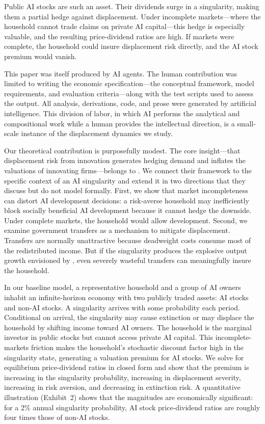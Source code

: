 \documentclass[12pt]{article}
\begin{document}
Public AI stocks are such an asset.
Their dividends surge in a singularity, making them a partial hedge against displacement.
Under incomplete markets---where the household cannot trade claims on private AI capital---this hedge is especially valuable, and the resulting price-dividend ratios are high.
If markets were complete, the household could insure displacement risk directly, and the AI stock premium would vanish.

This paper was itself produced by AI agents.
The human contribution was limited to writing the economic specification---the conceptual framework, model requirements, and evaluation criteria---along with the test scripts used to assess the output.
All analysis, derivations, code, and prose were generated by artificial intelligence.
This division of labor, in which AI performs the analytical and compositional work while a human provides the intellectual direction, is a small-scale instance of the displacement dynamics we study.

Our theoretical contribution is purposefully modest.
The core insight---that displacement risk from innovation generates hedging demand and inflates the valuations of innovating firms---belongs to \citet{GKP2012}.
We connect their framework to the specific context of an AI singularity and extend it in two directions that they discuss but do not model formally.
First, we show that market incompleteness can distort AI development decisions: a risk-averse household may inefficiently block socially beneficial AI development because it cannot hedge the downside.
Under complete markets, the household would allow development.
Second, we examine government transfers as a mechanism to mitigate displacement.
Transfers are normally unattractive because deadweight costs consume most of the redistributed income.
But if the singularity produces the explosive output growth envisioned by \citet{Jones2024}, even severely wasteful transfers can meaningfully insure the household.

In our baseline model, a representative household and a group of AI owners inhabit an infinite-horizon economy with two publicly traded assets: AI stocks and non-AI stocks.
A singularity arrives with some probability each period.
Conditional on arrival, the singularity may cause extinction \citep{Jones2024,Bostrom2014} or may displace the household by shifting income toward AI owners.
The household is the marginal investor in public stocks but cannot access private AI capital.
This incomplete-markets friction makes the household's stochastic discount factor high in the singularity state, generating a valuation premium for AI stocks.
We solve for equilibrium price-dividend ratios in closed form and show that the premium is increasing in the singularity probability, increasing in displacement severity, increasing in risk aversion, and decreasing in extinction risk.
A quantitative illustration (Exhibit~2) shows that the magnitudes are economically significant: for a 2\% annual singularity probability, AI stock price-dividend ratios are roughly four times those of non-AI stocks.
\end{document}

